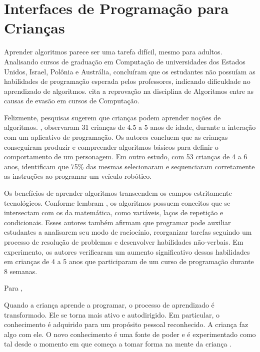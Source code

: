 \section{Interfaces de Programação para Crianças}
\label{section_interfaces}

Aprender algoritmos parece ser uma tarefa difícil, mesmo para adultos. Analisando cursos de graduação em Computação de universidades dos Estados Unidos, Israel, Polônia e Austrália,  concluíram que os estudantes não possuíam as habilidades de programação esperada pelos professores, indicando dificuldade no aprendizado de algoritmos.  cita a reprovação na disciplina de Algoritmos entre as causas de evasão em cursos de Computação.

Felizmente, pesquisas sugerem que crianças podem aprender noções de algoritmos. , observaram 31 crianças de 4.5 a 5 anos de idade, durante a interação com um aplicativo de programação. Os autores concluem que as crianças conseguiram produzir e compreender algoritmos básicos para definir o comportamento de um personagem. Em outro estudo, com 53 crianças de 4 a 6 anos,  identificam que 75\% das mesmas selecionaram e sequenciaram corretamente as instruções ao programar um veículo robótico.

Os benefícios de aprender algoritmos transcendem os campos estritamente tecnológicos. Conforme lembram , os algoritmos possuem conceitos que se intersectam com os da matemática, como variáveis, laços de repetição e condicionais. Esses autores também afirmam que programar pode auxiliar estudantes a analisarem seu modo de raciocínio, reorganizar tarefas seguindo um processo de resolução de problemas e desenvolver habilidades não-verbais. Em experimento, os autores verificaram um aumento significativo dessas habilidades em crianças de 4 a 5 anos que participaram de um curso de programação durante 8 semanas.

Para ,

\begin{citacao}
Quando a criança aprende a programar, o processo de aprendizado é transformado. Ele se torna mais ativo e autodirigido. Em particular, o conhecimento é adquirido para um propósito pessoal reconhecido. A criança faz algo com ele. O novo conhecimento é uma fonte de poder e é experimentado como tal desde o momento em que começa a tomar forma na mente da criança \cite[p.21, tradução nossa]{papert_exploration_1996}.
\end{citacao}

